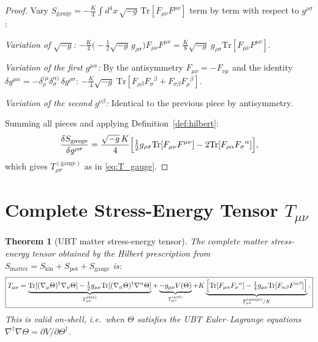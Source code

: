 \documentclass[12pt]{article}
\newtheorem{theorem}[definition]{Theorem}
\newcommand{\Tr}{\mathrm{Tr}}
\begin{document}
\begin{proof}
Vary $S_{\mathrm{gauge}} = -\tfrac{K}{4}\int d^4x\,\sqrt{-g}\,
\Tr[F_{\mu\nu}F^{\mu\nu}]$ term by term with respect to $g^{\rho\sigma}$:

\textit{Variation of $\sqrt{-g}$:}
$\displaystyle-\frac{K}{4}\bigl(-\tfrac{1}{2}\sqrt{-g}\,g_{\rho\sigma}\bigr)
F_{\mu\nu}F^{\mu\nu}
= \frac{K}{8}\sqrt{-g}\;g_{\rho\sigma}\Tr[F_{\mu\nu}F^{\mu\nu}]$.

\textit{Variation of the first $g^{\mu\alpha}$:}
By the antisymmetry $F_{\mu\nu} = -F_{\nu\mu}$ and the identity
$\delta g^{\mu\alpha} = -\delta^{(\mu}_\rho\delta^{\alpha)}_\sigma\,\delta g^{\rho\sigma}$:
$\displaystyle-\frac{K}{4}\sqrt{-g}\;\Tr[F_{\rho\beta}F_\sigma{}^\beta
+ F_{\sigma\beta}F_\rho{}^\beta]$.

\textit{Variation of the second $g^{\nu\beta}$:}
Identical to the previous piece by antisymmetry.

Summing all pieces and applying Definition~\ref{def:hilbert}:
\begin{equation}
  \frac{\delta S_{\mathrm{gauge}}}{\delta g^{\rho\sigma}}
  = \frac{\sqrt{-g}\,K}{4}\Bigl[
      \tfrac{1}{2}g_{\rho\sigma}\Tr[F_{\mu\nu}F^{\mu\nu}]
      - 2\Tr[F_{\rho\alpha}F_\sigma{}^{\alpha}]
    \Bigr],
\end{equation}
which gives $T^{(\mathrm{gauge})}_{\rho\sigma}$ as in \eqref{eq:T_gauge}.
\end{proof}

\section{Complete Stress-Energy Tensor $T_{\mu\nu}$}
\label{sec:T_total}

\begin{theorem}[UBT matter stress-energy tensor]
\label{thm:T_matter}
The complete matter stress-energy tensor obtained by the Hilbert prescription
from $S_{\mathrm{matter}} = S_{\mathrm{kin}} + S_{\mathrm{pot}} + S_{\mathrm{gauge}}$ is:
\begin{equation}
  \label{eq:T_total}
  \boxed{
    T_{\mu\nu}
    = \underbrace{\Tr[(\nabla_\mu\Theta)^\dagger\nabla_\nu\Theta]
        - \tfrac{1}{2}g_{\mu\nu}\Tr[(\nabla_\alpha\Theta)^\dagger\nabla^\alpha\Theta]}_{
        T^{(\mathrm{kin})}_{\mu\nu}}
    + \underbrace{-g_{\mu\nu}V(\Theta)}_{
        T^{(\mathrm{pot})}_{\mu\nu}}
    + K\underbrace{\Bigl[\Tr[F_{\mu\alpha}F_\nu{}^\alpha]
        - \tfrac{1}{4}g_{\mu\nu}\Tr[F_{\alpha\beta}F^{\alpha\beta}]\Bigr]}_{
        T^{(\mathrm{gauge})}_{\mu\nu}/K}.
  }
\end{equation}
This is valid on-shell, i.e.\ when $\Theta$ satisfies the UBT Euler--Lagrange
equations $\nabla^\dagger\nabla\Theta = \partial V/\partial\Theta^\dagger$.
\end{theorem}
\end{document}
